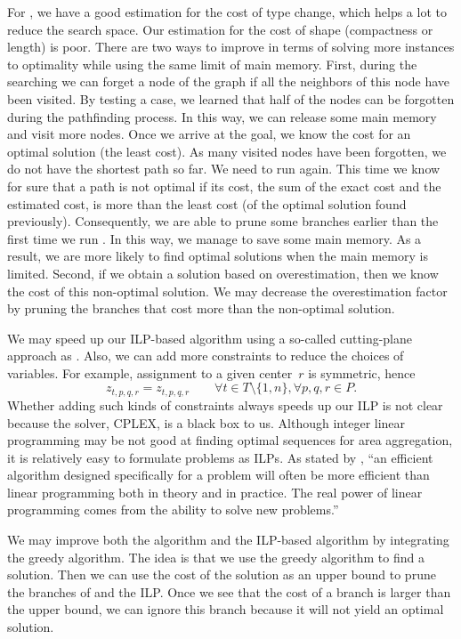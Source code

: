 \documentclass[acmsmall,natbib=false]{acmart}
\begin{document}
For \Astar, we have a good estimation for the cost of type 
change, which helps a lot to reduce the search space. 
Our estimation for the cost of shape 
(compactness or length) is poor.
There are two ways to improve \Astar
in terms of solving more instances to optimality 
while using the same limit of main memory.
First, during the searching we can forget a node of the graph
if all the neighbors of this node have been visited.
By testing a case, we learned that half of the nodes can be 
forgotten during the pathfinding process.
In this way, we can release some main memory 
and visit more nodes.
Once we arrive at the goal, 
we know the cost for 
an optimal solution (the least cost).
As many visited nodes have been forgotten, 
we do not have the shortest path so far.
We need to run \Astar again.
This time we know for sure that 
a path is not optimal if its cost, 
the sum of the exact cost and the estimated cost, 
is more than the least cost 
(of the optimal solution found previously).
Consequently, we are able to prune some branches earlier 
than the first time we run \Astar.
In this way, we manage to save some main memory.
As a result, we are more likely to find optimal solutions
when the main memory is limited.
Second, if we obtain a solution based on overestimation, 
then we know the cost of this non-optimal solution.
We may decrease the overestimation factor by pruning the branches
that cost more than the non-optimal solution.


We may speed up our ILP-based algorithm using a so-called 
cutting-plane approach as \textcite{Oehrlein2017Aggregation}.
Also, we can add more constraints to
reduce the choices of variables.
For example, assignment to a given center~$r$ is symmetric, 
hence
\begin{equation*}
\label{eq:CstrZX}
z_{t,p,q,r}= z_{t,p,q,r} \qquad
\forall t \in {T} \setminus \{1,n\}, 
\forall p, q, r \in P.
\end{equation*}
Whether adding such kinds of constraints always
speeds up our ILP is not clear
because the solver, CPLEX, is a black box to us.
Although integer linear programming may be not good at 
finding optimal sequences for area aggregation,
it is relatively easy to formulate problems as ILPs.
As stated by \citet[p.~861]{Cormen2009}, 
``an efficient algorithm designed specifically for a problem 
will often be more efficient than 
linear programming both in theory and in practice. 
The real power of linear programming comes from 
the ability to solve new problems.''

We may improve both the \Astar algorithm and the ILP-based 
algorithm by integrating the greedy algorithm.
The idea is that we use the greedy algorithm to find 
a solution. 
Then we can use the cost of the solution as an upper bound to 
prune the branches of \Astar and the ILP. 
Once we see that
the cost of a branch is larger than the upper bound,
we can ignore this branch  
because it will not yield an optimal solution.
\end{document}
